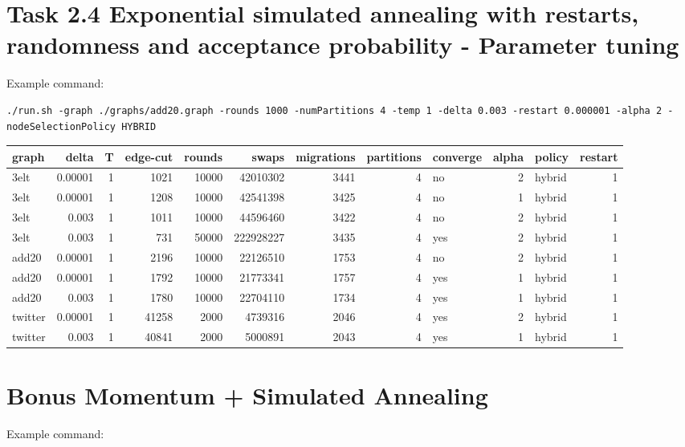 \documentclass[11pt]{article}
\begin{document}
\section{Task 2.4 Exponential simulated annealing with restarts, randomness and acceptance probability - Parameter tuning}
\label{sec-6}
Example command:

\begin{verbatim}
./run.sh -graph ./graphs/add20.graph -rounds 1000 -numPartitions 4 -temp 1 -delta 0.003 -restart 0.000001 -alpha 2 -nodeSelectionPolicy HYBRID
\end{verbatim}
\begin{center}
\begin{tabular}{lrrrrrrrlrlr}
graph & delta & T & edge-cut & rounds & swaps & migrations & partitions & converge & alpha & policy & restart\\
\hline
3elt & 0.00001 & 1 & 1021 & 10000 & 42010302 & 3441 & 4 & no & 2 & hybrid & 1\\
3elt & 0.00001 & 1 & 1208 & 10000 & 42541398 & 3425 & 4 & no & 1 & hybrid & 1\\
3elt & 0.003 & 1 & 1011 & 10000 & 44596460 & 3422 & 4 & no & 2 & hybrid & 1\\
3elt & 0.003 & 1 & 731 & 50000 & 222928227 & 3435 & 4 & yes & 2 & hybrid & 1\\
add20 & 0.00001 & 1 & 2196 & 10000 & 22126510 & 1753 & 4 & no & 2 & hybrid & 1\\
add20 & 0.00001 & 1 & 1792 & 10000 & 21773341 & 1757 & 4 & yes & 1 & hybrid & 1\\
add20 & 0.003 & 1 & 1780 & 10000 & 22704110 & 1734 & 4 & yes & 1 & hybrid & 1\\
twitter & 0.00001 & 1 & 41258 & 2000 & 4739316 & 2046 & 4 & yes & 2 & hybrid & 1\\
twitter & 0.003 & 1 & 40841 & 2000 & 5000891 & 2043 & 4 & yes & 1 & hybrid & 1\\
\end{tabular}
\end{center}

\section{Bonus Momentum + Simulated Annealing}
\label{sec-7}
Example command:
\end{document}
